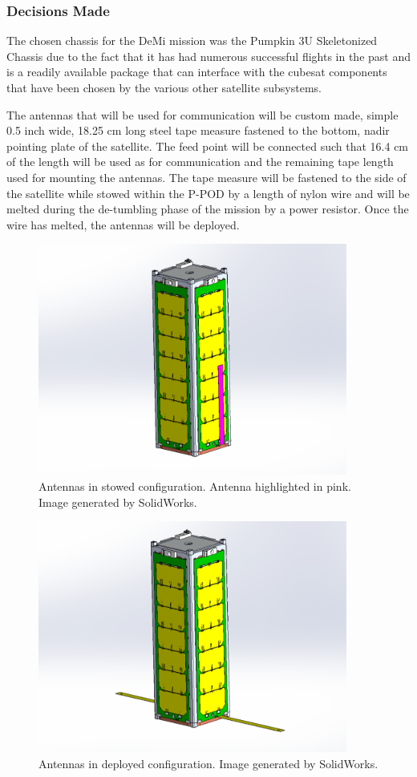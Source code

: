 \documentclass[12pt]{article}
\begin{document}
\subsubsection{Decisions Made}
The chosen chassis for the DeMi mission was the Pumpkin 3U Skeletonized Chassis due to the fact that it has had numerous successful flights in the past and is a readily available package that can interface with the cubesat components that have been chosen by the various other satellite subsystems.

The antennas that will be used for communication will be custom made, simple 0.5 inch wide, 18.25 cm long steel tape measure fastened to the bottom, nadir pointing plate of the satellite. The feed point will be connected such that 16.4 cm of the length will be used as for communication and the remaining tape length used for mounting the antennas. The tape measure will be fastened to the side of the satellite while stowed within the P-POD by a length of nylon wire and will be melted during the de-tumbling phase of the mission by a power resistor. Once the wire has melted, the antennas will be deployed.

\begin{figure}[!ht]
\centering
\includegraphics[width=4in]{images/STR-4-Revised.png}
\caption{Antennas in stowed configuration. Antenna highlighted in pink. Image generated by SolidWorks.}
\label{fig:str-4}
\end{figure}

\begin{figure}[!ht]
\centering
\includegraphics[width=4in]{images/STR-5-Revised.png}
\caption{Antennas in deployed configuration. Image generated by SolidWorks.}
\label{fig:str-5}
\end{figure}
\end{document}
